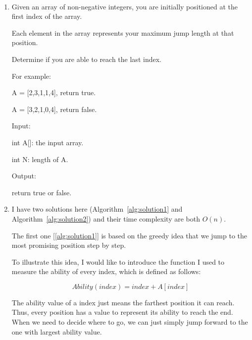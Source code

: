 \documentclass[12pt,a4paper]{article}
\makeatletter
\newtheorem*{solution}{Solution}
\renewenvironment{solution}[1][Solution] {\par\pushQED{\qed}\normalfont\topsep6\p@\@plus6\p@\relax\trivlist\item[\hskip\labelsep\bfseries#1\@addpunct{.}]\ignorespaces}{\popQED\endtrivlist\@endpefalse} \makeatother
\makeatother
\begin{document}
\setlength\parindent{0em}

\noindent{}


~\\
\begin{enumerate}

\item Given an array of non-negative integers, you are initially positioned at the first index of the array.

Each element in the array represents your maximum jump length at that position.

Determine if you are able to reach the last index.

For example:

A = [2,3,1,1,4], return true.

A = [3,2,1,0,4], return false.

Input:

int A[]: the input array.

int N: length of A.

Output:

return true or false.


\begin{solution}   
I have two solutions here (Algorithm~\ref{alg:solution1} and Algorithm~\ref{alg:solution2}) and their time complexity are both $O(n)$.

The first one [\ref{alg:solution1}] is based on the greedy idea that we jump to the most promising position step by step. 


To illustrate this idea, I would like to introduce the function I used to measure the ability of every index, which is defined as follows:

\[Ability(index) = index + A[index] \]

The ability value of a index just means the farthest position it can reach.
Thus, every position has a value to represent its ability to reach the end. When we need to decide where to go, we can just simply jump forward to the one with largest ability value. \\ 


\end{solution}
\end{enumerate}
\end{document}
